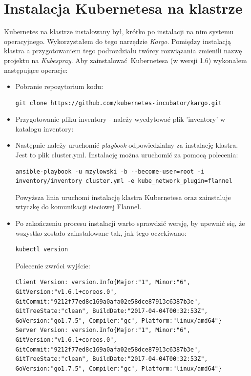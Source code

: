 \documentclass[10pt,a4paper,titlepage,twoside]{report}
\begin{document}
\section{Instalacja Kubernetesa na klastrze}
Kubernetes na klastrze instalowany był, krótko po instalacji na nim systemu operacyjnego. Wykorzystałem do tego narzędzie \textit{Kargo}. Pomiędzy instalacją klastra a przygotowaniem tego podrozdziału twórcy rozwiązania zmienili nazwę projektu na \textit{Kubespray}. Aby zainstalować Kubernetesa (w wersji 1.6) wykonałem następujące operacje:
\begin{itemize}
\item Pobranie repozytorium kodu:
\begin{lstlisting}[breaklines=true]
git clone https://github.com/kubernetes-incubator/kargo.git
\end{lstlisting}
\item Przygotowanie pliku inventory - należy wyedytować plik 'inventory' w katalogu inventory:

\item Następnie należy uruchomić \textit{playbook} odpowiedzialny za instalację klastra. Jest to plik cluster.yml. Instalację można uruchomić za pomocą polecenia:
\begin{lstlisting}[breaklines=true]
ansible-playbook -u mzylowski -b --become-user=root -i inventory/inventory cluster.yml -e kube_network_plugin=flannel
\end{lstlisting}
Powyższa linia uruchomi instalację klastra Kubernetesa oraz zainstaluje wtyczkę do komunikacji sieciowej Flannel.
\item Po zakończeniu procesu instalacji warto sprawdzić wersję, by upewnić się, że wszystko zostało zainstalowane tak, jak tego oczekiwano:
\begin{lstlisting}[breaklines=true]
kubectl version
\end{lstlisting}
Polecenie zwróci wyjście:
\begin{lstlisting}[breaklines=true]
Client Version: version.Info{Major:"1", Minor:"6", GitVersion:"v1.6.1+coreos.0", GitCommit:"9212f77ed8c169a0afa02e58dce87913c6387b3e", GitTreeState:"clean", BuildDate:"2017-04-04T00:32:53Z", GoVersion:"go1.7.5", Compiler:"gc", Platform:"linux/amd64"}
Server Version: version.Info{Major:"1", Minor:"6", GitVersion:"v1.6.1+coreos.0", GitCommit:"9212f77ed8c169a0afa02e58dce87913c6387b3e", GitTreeState:"clean", BuildDate:"2017-04-04T00:32:53Z", GoVersion:"go1.7.5", Compiler:"gc", Platform:"linux/amd64"}
\end{lstlisting}

\end{itemize}
\end{document}
